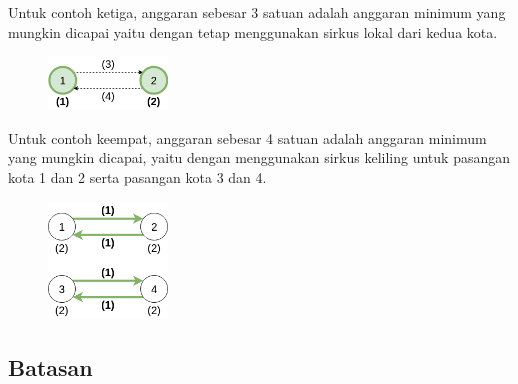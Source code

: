 \documentclass[../main_problemset.tex]{subfiles} %
\begin{document}
Untuk contoh ketiga, anggaran sebesar 3 satuan adalah anggaran minimum yang mungkin dicapai yaitu dengan tetap menggunakan sirkus lokal dari kedua kota.

\begin{figure}[H]
	\centering
	\includegraphics[width=120px]{bis-ddak/asset/Sample_3_OK}
\end{figure}

Untuk contoh keempat, anggaran sebesar 4 satuan adalah anggaran minimum yang mungkin dicapai, yaitu dengan menggunakan sirkus keliling untuk pasangan kota 1 dan 2 serta pasangan kota 3 dan 4.

\begin{figure}[H]
	\centering
	\includegraphics[width=120px]{bis-ddak/asset/Sample_4_OK}
\end{figure}

\subsection*{Batasan}
\end{document}

